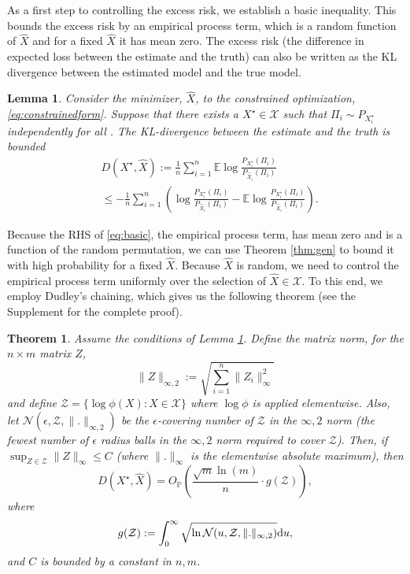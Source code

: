 \documentclass{article}
\newtheorem{theorem}{Theorem}
\newtheorem{lemma}{Lemma}
\begin{document}
As a first step to controlling the excess risk, we establish a basic inequality.
This bounds the excess risk by an empirical process term, which is a random function of $\hat X$ and for a fixed $\hat X$ it has mean zero.
The excess risk (the difference in expected loss between the estimate and the truth) can also be written as the KL divergence between the estimated model and the true model.

\begin{lemma}
\label{lem:basic}
Consider the minimizer, $\hat X$, to the constrained optimization, \eqref{eq:constrainedform}.  Suppose that there exists a $X^\star \in \mathcal X$ such that $\Pi_i \sim P_{X^\star_i}$ independently for all .  
The KL-divergence between the estimate and the truth is bounded
\begin{align*}
&D(X^\star,\hat X) := \frac 1n \sum_{i=1}^n \mathbb E \log \frac{P_{X_i^\star}(\Pi_i)}{P_{\hat X_i}(\Pi_i)} \tag{basic} \label{eq:basic} \\
&\le - \frac 1n \sum_{i=1}^n \left( \log \frac{P_{X_i^\star}(\Pi_i)}{P_{\hat X_i}(\Pi_i)} - \mathbb E \log \frac{P_{X_i^\star}(\Pi_i)}{P_{\hat X_i}(\Pi_i)} \right).
\end{align*}
\end{lemma}

Because the RHS of \eqref{eq:basic}, the empirical process term, has mean zero and is a function of the random permutation, we can use Theorem \ref{thm:gen} to bound it with high probability for a fixed $\hat X$.
Because $\hat X$ is random, we need to control the empirical process term uniformly over the selection of $\hat X \in \mathcal X$.
To this end, we employ Dudley's chaining, which gives us the following theorem (see the Supplement for the complete proof).

\begin{theorem}
\label{thm:chaining}
Assume the conditions of Lemma \ref{lem:basic}.
Define the matrix norm, for the $n \times m$ matrix $Z$,
$$
\| Z \|_{\infty, 2} := \sqrt{ \sum_{i=1}^n \| Z_i \|_\infty^2} 
$$
and define $\mathcal Z = \{ \log \phi(X) : X \in \mathcal X\}$ where $\log \phi$ is applied elementwise.
Also, let $\mathcal N(\epsilon, \mathcal Z, \| . \|_{\infty,2})$ be the $\epsilon$-covering number of $\mathcal Z$ in the $\infty,2$ norm (the fewest number of $\epsilon$ radius balls in the $\infty,2$ norm required to cover $\mathcal Z$). Then, if $\sup_{Z \in \mathcal Z} \| Z \|_\infty \le C$ (where $\| . \|_\infty$ is the elementwise absolute maximum), then
\begin{equation*}
D(X^\star,\hat X) = O_{\mathbb P} \left( \frac{\sqrt m \ln(m)}{n} \cdot g(\mathcal Z) \right),
\end{equation*}
where 
\begin{equation*}
g(\mathcal Z) := \int_0^\infty \sqrt{\ln \mathcal N (u,\mathcal Z, \|. \|_{\infty,2})} {\rm d}u,
\end{equation*}
and $C$ is bounded by a constant in $n,m$.
\end{theorem}
\end{document}
